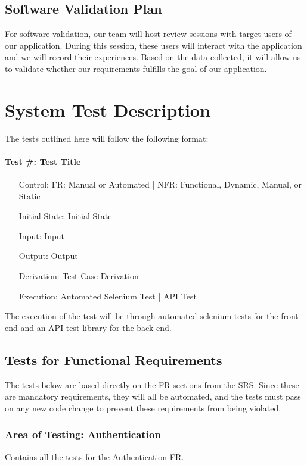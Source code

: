 \documentclass[12pt, titlepage]{article}
\begin{document}
\subsection{Software Validation Plan}
For software validation, our team will host review sessions with target users of our application. During this session, these users will interact with the application and we will record their experiences. Based on the data collected, it will allow us to validate whether our requirements fulfills the goal of our application.

\section{System Test Description}
The tests outlined here will follow the following format:
\paragraph*{Test \#{}: Test Title}
\begin{itemize}
	\item[Control:] FR: Manual or Automated | NFR: Functional, Dynamic, Manual, or Static
	\item[Initial State:] Initial State
	\item[Input:] Input
	\item[Output:] Output
	\item[Derivation:] Test Case Derivation
	\item[Execution:] Automated Selenium Test | API Test
\end{itemize}
The execution of the test will be through automated selenium tests for the front-end and an API test library for the back-end.

\subsection{Tests for Functional Requirements}
The tests below are based directly on the FR sections from the SRS. Since these are mandatory requirements, they will all be automated, and the tests must pass on any new code change to prevent these requirements from being violated.

\subsubsection{Area of Testing: Authentication}
Contains all the tests for the Authentication FR.
\end{document}
